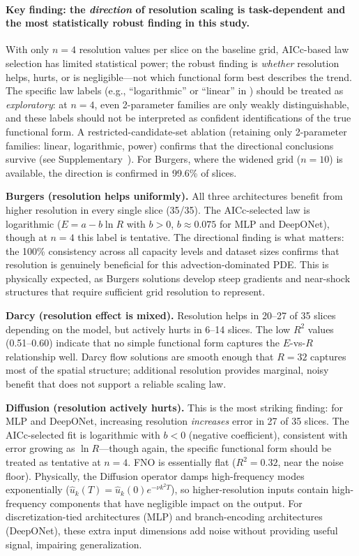 \documentclass[11pt]{article}
\begin{document}
\paragraph{Key finding: the \emph{direction} of resolution scaling
is task-dependent and the most statistically robust finding in
this study.}
With only $n=4$ resolution values per slice on the baseline grid,
AICc-based law selection has limited statistical power; the robust
finding is \emph{whether}
resolution helps, hurts, or is negligible---not which functional form
best describes the trend. The specific law labels (e.g.,
``logarithmic'' or ``linear'' in ) should be
treated as \emph{exploratory}: at $n=4$, even 2-parameter families
are only weakly distinguishable, and these labels should not be
interpreted as confident identifications of the true functional form.
A restricted-candidate-set ablation
(retaining only 2-parameter families: linear, logarithmic, power)
confirms that the directional conclusions survive (see
Supplementary~). For Burgers, where
the widened grid ($n = 10$) is available, the direction is confirmed
in 99.6\% of slices.

\textbf{Burgers (resolution helps uniformly).}
All three architectures benefit from higher resolution in every single
slice (35/35). The AICc-selected law is logarithmic
($E = a - b \ln R$ with $b > 0$, $b \approx 0.075$ for MLP and
DeepONet), though at $n=4$ this label is tentative.
The directional finding is what matters: the 100\% consistency
across all capacity levels and dataset sizes confirms that resolution
is genuinely beneficial for this advection-dominated PDE. This is
physically expected, as Burgers solutions develop steep gradients
and near-shock structures that require sufficient grid resolution
to represent.

\textbf{Darcy (resolution effect is mixed).}
Resolution helps in 20--27 of 35 slices depending on the model, but
actively hurts in 6--14 slices. The low $R^2$ values
(0.51--0.60) indicate that no simple functional form captures the
$E$-vs-$R$ relationship well. Darcy flow solutions are smooth enough
that $R = 32$ captures most of the spatial structure; additional
resolution provides marginal, noisy benefit that does not support a
reliable scaling law.

\textbf{Diffusion (resolution actively hurts).}
This is the most striking finding: for MLP and DeepONet, increasing
resolution \emph{increases} error in 27 of 35 slices. The
AICc-selected fit is logarithmic with $b < 0$ (negative coefficient),
consistent with error growing as $\ln R$---though again, the
specific functional form should be treated as tentative at $n=4$.
FNO is essentially flat ($R^2 = 0.32$, near the noise floor). Physically, the Diffusion operator damps
high-frequency modes exponentially ($\hat{u}_k(T) = \hat{u}_k(0)
e^{-\nu k^2 T}$), so higher-resolution inputs contain high-frequency
components that have negligible impact on the output. For
discretization-tied architectures (MLP) and branch-encoding
architectures (DeepONet), these extra input dimensions add noise
without providing useful signal, impairing generalization.
\end{document}
